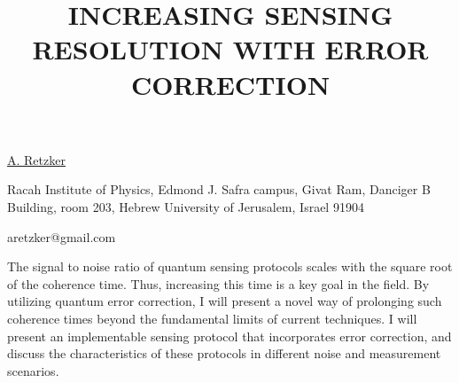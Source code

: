 \title{INCREASING SENSING RESOLUTION WITH ERROR CORRECTION}

\underline{A. Retzker}


{\normalsize{\vspace{-4mm}
Racah Institute of Physics,
Edmond J. Safra campus, Givat Ram,
Danciger B Building, room 203,
Hebrew University of Jerusalem,
Israel 91904

\email aretzker@gmail.com}}

The signal to noise ratio of quantum sensing protocols scales with the square root of the coherence time. Thus, increasing this time
is a key goal in the field. By utilizing quantum error correction, I will present a novel way of prolonging such coherence times beyond
the fundamental limits of current techniques. I will present an implementable sensing protocol that incorporates error correction, and
discuss the characteristics of these protocols in different noise and measurement scenarios.

\vspace{\baselineskip}
